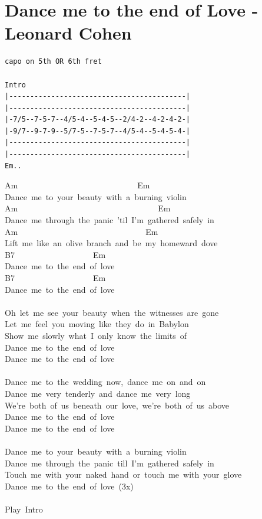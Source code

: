 \documentclass[]{book}
\let\stdsection\section
\renewcommand\section{\clearpage\stdsection}
\begin{document}
\hypertarget{dance-me-to-the-end-of-love---leonard-cohen}{%
\section{Dance me to the end of Love - Leonard Cohen}\label{dance-me-to-the-end-of-love---leonard-cohen}}

\begin{verbatim}
capo on 5th OR 6th fret

Intro
|------------------------------------------|
|------------------------------------------|
|-7/5--7-5-7--4/5-4--5-4-5--2/4-2--4-2-4-2-|
|-9/7--9-7-9--5/7-5--7-5-7--4/5-4--5-4-5-4-|
|------------------------------------------|
|------------------------------------------|
Em..
\end{verbatim}

Am~~~~~~~~~~~~~~~~~~~~~~~~~~~~~Em\\
Dance~me~to~your~beauty~with~a~burning~violin\\
Am~~~~~~~~~~~~~~~~~~~~~~~~~~~~~~~~~~Em\\
Dance~me~through~the~panic~'til~I'm~gathered~safely~in\\
Am~~~~~~~~~~~~~~~~~~~~~~~~~~~~~~~Em\\
Lift~me~like~an~olive~branch~and~be~my~homeward~dove\\
B7~~~~~~~~~~~~~~~~~~~Em\\
Dance~me~to~the~end~of~love\\
B7~~~~~~~~~~~~~~~~~~~Em\\
Dance~me~to~the~end~of~love\\
~\\
Oh~let~me~see~your~beauty~when~the~witnesses~are~gone~\\
Let~me~feel~you~moving~like~they~do~in~Babylon~\\
Show~me~slowly~what~I~only~know~the~limits~of~\\
Dance~me~to~the~end~of~love~\\
Dance~me~to~the~end~of~love~\\
~\\
Dance~me~to~the~wedding~now,~dance~me~on~and~on~\\
Dance~me~very~tenderly~and~dance~me~very~long~\\
We're~both~of~us~beneath~our~love,~we're~both~of~us~above~\\
Dance~me~to~the~end~of~love~\\
Dance~me~to~the~end~of~love\\
~\\
Dance~me~to~your~beauty~with~a~burning~violin~\\
Dance~me~through~the~panic~till~I'm~gathered~safely~in~\\
Touch~me~with~your~naked~hand~or~touch~me~with~your~glove~\\
Dance~me~to~the~end~of~love~(3x)\\
~\\
Play~Intro\\
~\\
\end{document}
